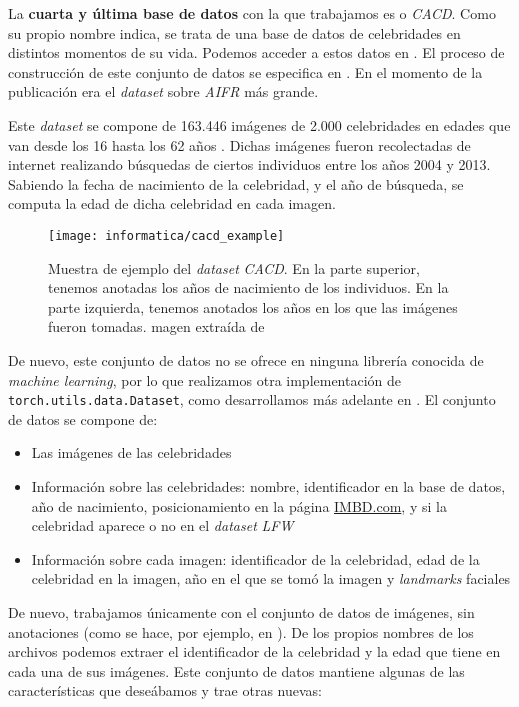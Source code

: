 La \textbf{cuarta y última base de datos} con la que trabajamos es  o \textit{CACD}. Como su propio nombre indica, se trata de una base de datos de celebridades en distintos momentos de su vida. Podemos acceder a estos datos en \cite{informatica:cacd_dataset}. El proceso de construcción de este conjunto de datos se especifica en \cite{informatica:paper_cacd}. En el momento de la publicación era el \textit{dataset} sobre \textit{AIFR} más grande.

Este \textit{dataset} se compone de 163.446 imágenes de 2.000 celebridades en edades que van desde los 16 hasta los 62 años \cite{informatica:paper_cacd}. Dichas imágenes fueron recolectadas de internet realizando búsquedas de ciertos individuos entre los años 2004 y 2013. Sabiendo la fecha de nacimiento de la celebridad, y el año de búsqueda, se computa la edad de dicha celebridad en cada imagen.

\begin{figure}[H]
    \centering
    \texttt{[image: informatica/cacd\_example]}
    \caption{Muestra de ejemplo del \textit{dataset} \textit{CACD}. En la parte superior, tenemos anotadas los años de nacimiento de los individuos. En la parte izquierda, tenemos anotados los años en los que las imágenes fueron tomadas. magen extraída de \cite{informatica:paper_cacd}}
    \label{img:cacd_imagenes_ejemplo}
\end{figure}

De nuevo, este conjunto de datos no se ofrece en ninguna librería conocida de \textit{machine learning}, por lo que realizamos otra implementación de \lstinline{torch.utils.data.Dataset}, como desarrollamos más adelante en . El conjunto de datos se compone de:

\begin{itemize}
    \item Las imágenes de las celebridades
    \item Información sobre las celebridades: nombre, identificador en la base de datos, año de nacimiento, posicionamiento en la página \url{IMBD.com}, y si la celebridad aparece o no en el \textit{dataset} \textit{LFW}
    \item Información sobre cada imagen: identificador de la celebridad, edad de la celebridad en la imagen, año en el que se tomó la imagen y \textit{landmarks} faciales
\end{itemize}

De nuevo, trabajamos únicamente con el conjunto de datos de imágenes, sin anotaciones (como se hace, por ejemplo, en \cite{informatica:facenet}). De los propios nombres de los archivos podemos extraer el identificador de la celebridad y la edad que tiene en cada una de sus imágenes. Este conjunto de datos mantiene algunas de las características que deseábamos y trae otras nuevas:

